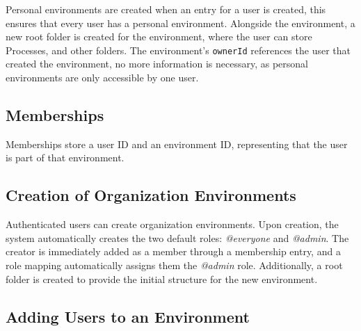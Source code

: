 Personal environments are created when an entry for a user is created, this ensures that
every user has a personal environment.
Alongside the environment, a new root folder is created for the environment, where the
user can store Processes, and other folders.
The environment's \lstinline{ownerId} references the user that created the environment,
no more information is necessary, as personal environments are only accessible by one
user.

\subsection{Memberships}

Memberships store a user ID and an environment ID, representing that the user is part of that environment.

\subsection{Creation of Organization Environments}

Authenticated users can create organization environments.
Upon creation, the system automatically creates the two default roles: \textit{@everyone}
and \textit{@admin}.
The creator is immediately added as a member through a membership entry,
and a role mapping automatically assigns them the \textit{@admin} role.
Additionally, a root folder is created to provide the initial structure for the new environment.



\subsection{Adding Users to an Environment}

